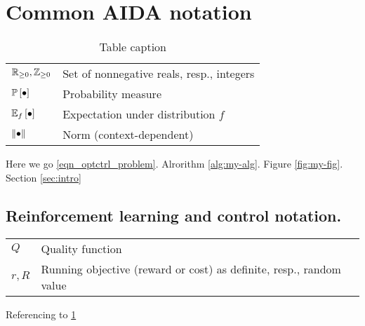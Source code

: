 \documentclass[12pt,twoside]{../../mitthesis}
\begin{document}
\section*{Common AIDA notation}

\begin{table}
\caption{Table caption}
\label{table:my-table}
\begin{tabularx}{0.97\textwidth}{ |p{}|p{}| }  
\hline
$\R_{\ge 0}, \Z_{\ge 0}$ & Set of nonnegative reals, resp., integers \\ 
$\PP{\bullet}$ & Probability measure \\
$\E[f]{\bullet}$ & Expectation under distribution $f$ \\
$\nrm{\bullet}$ & Norm (context-dependent) \\
\hline
\end{tabularx}
\end{table}
Here we go \eqref{eqn_optctrl_problem}. Alrorithm \ref{alg:my-alg}. Figure \ref{fig:my-fig}. Section \ref{sec:intro}

\subsection*{Reinforcement learning and control notation.}
\begin{tabularx}{0.97\textwidth}{ |p{}|p{}| }  
\hline
$Q$ & Quality function \\ 
$r, R$ & Running objective (reward or cost) as definite, resp., random value\\
\hline
\end{tabularx}


Referencing to \ref{table:my-table}
\end{document}
